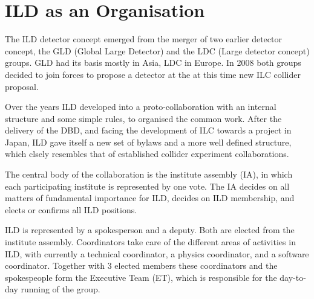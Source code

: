 \chapter{ILD as an Organisation}
The ILD detector concept emerged from the merger of two earlier detector concept, the GLD (Global Large Detector) and the LDC (Large detector concept) groups. GLD had its basis mostly in Asia, LDC in Europe. In 2008 both groups decided to join forces to propose a detector at the at this time new ILC collider proposal. 

Over the years ILD developed into a proto-collaboration with an internal structure and some simple rules, to organised the common work. After the delivery of the DBD, and facing the development of ILC towards a project in Japan, ILD gave itself a new set of bylaws and a more well defined structure, which clsely resembles that of established collider experiment collaborations. 

The central body of the collaboration is the institute assembly (IA), in which each participating institute is represented by one vote. The IA decides on all matters of fundamental importance for ILD, decides on ILD membership, and elects or confirms all ILD positions. 

ILD is represented by a spokesperson and a deputy. Both are elected from the institute assembly. Coordinators take care of the different areas of activities in ILD, with currently a technical coordinator, a physics coordinator, and a software coordinator. Together with 3 elected members these coordinators and the spokespeople form the Executive Team (ET), which is responsible for the day-to-day running of the group. 

